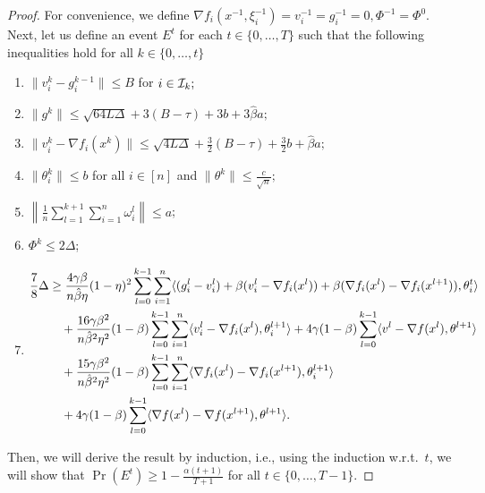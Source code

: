 \documentclass[a4paper,11pt]{article}
\begin{document}
\begin{proof} 
    For convenience, we define $\nabla f_i(x^{-1},\xi^{-1}_i) = v_i^{-1} = g_i^{-1} = 0, \Phi^{-1} = \Phi^0$. Next, let us define an event $E^t$ for each $t\in\{0,\dots,T\}$ such that the following inequalities hold for all $k\in\{0,\dots,t\}$
    \begin{enumerate}
        \item $\|v_i^k - g_i^{k-1}\| \le B$ for $i\in \mathcal{I}_{k};$
        \item $\|g^k\| \le \sqrt{64L\Delta} + 3(B-\tau) + 3 b + 3 \hat{\beta}a;$
        \item $\|v_i^k - \nabla f_i(x^k)\| \le \sqrt{4L\Delta} + \frac{3}{2}(B-\tau) + \frac{3}{2}b + \hat{\beta}a;$
        \item $\|\theta^k_i\|\le b$ for all $i\in[n]$ and $\|\theta^k\|\le \frac{c}{\sqrt{n}};$
        \item $\left\|\frac{1}{n}\sum_{l=1}^{k+1}\sum_{i=1}^n\omega_i^l\right\| \le a$;
        \item $\Phi^k \le 2\Delta$;
        \item \begin{align*}
        \frac{7}{8}\Delta & \ge \frac{4\gamma\beta}{n\hat{\beta}\eta}(1-\eta)^2\sum_{l=0}^{k-1}\sum_{i=1}^n\<(g_i^{l} - v_i^{l}) + \beta(v_i^{l} - \nabla f_i(x^{l})) + \beta(\nabla f_i(x^{l})-\nabla f_i(x^{l+1})), \theta^t_i>\\
        &\quad + \frac{16\gamma\beta^2}{n\hat{\beta}^2\eta^2}(1-\beta)\sum_{l=0}^{k-1}\sum_{i=1}^n\<v_i^l - \nabla f_i(x^{l}), \theta^{l+1}_i>
        + 4\gamma(1-\beta)\sum_{l=0}^{k-1}\<v^l - \nabla f(x^{l}), \theta^{l+1}>\\
        &\quad +\frac{15\gamma\beta^2}{n\hat{\beta}^2\eta^2}(1-\beta)\sum_{l=0}^{k-1}\sum_{i=1}^n\<\nabla f_i(x^l) - \nabla f_i(x^{l+1}), \theta^{l+1}_i>\\
        & \quad + 4\gamma(1-\beta)\sum_{l=0}^{k-1}\<\nabla f(x^l) - \nabla f(x^{l+1}), \theta^{l+1}>.
        \end{align*}
    \end{enumerate}
    Then, we will derive the result by induction, i.e., using the induction w.r.t.\ $t$, we will show that $\Pr(E^t) \ge 1-\frac{\alpha(t+1)}{T+1}$ for all $t\in\{0,\dots, T-1\}$.
    

\end{proof}
\end{document}
